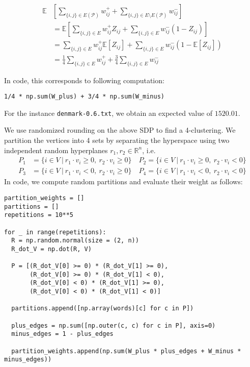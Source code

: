 \documentclass{article}
\begin{document}
\begin{align*}
    \mathbb{E}&\left[ \sum_{\{i,j\} \in E(\mathcal{P})} w_{ij}^+ + \sum_{\{i,j\} \in E \setminus E(\mathcal{P})} w_{ij}^-\right]\\
    &= \mathbb{E}\left[ \sum_{\{i,j\} \in E} w_{ij}^+ Z_{ij} + \sum_{\{i,j\} \in E} w_{ij}^- (1 - Z_{ij})\right]\\
    &= \sum_{\{i,j\} \in E} w_{ij}^+ \mathbb{E}[Z_{ij}] + \sum_{\{i,j\} \in E} w_{ij}^- (1 - \mathbb{E}[Z_{ij}])\\
    &= \frac{1}{4}\sum_{\{i,j\} \in E} w_{ij}^+ + \frac{3}{4}\sum_{\{i,j\} \in E} w_{ij}^-
\end{align*}

In code, this corresponds to following computation:
\begin{lstlisting}
1/4 * np.sum(W_plus) + 3/4 * np.sum(W_minus)
\end{lstlisting}
For the instance \texttt{denmark-0.6.txt}, we obtain an expected value of $1520.01$.\vspace{1em}

We use randomized rounding on the above SDP to find a 4-clustering. We partition the vertices into 4 sets by separating the hyperspace using two independent random hyperplanes $r_1, r_2 \in \mathbb{R}^n$, i.e.
\begin{align*}
    P_1 &= \{i \in V\ |\ r_1 \cdot v_i \ge 0,\ r_2 \cdot v_i \ge 0 \}\quad P_2 = \{i \in V\ |\ r_1 \cdot v_i \ge 0,\ r_2 \cdot v_i < 0 \}\\
    P_3 &= \{i \in V\ |\ r_1 \cdot v_i < 0,\ r_2 \cdot v_i \ge 0 \}\quad P_4 = \{i \in V\ |\ r_1 \cdot v_i < 0,\ r_2 \cdot v_i < 0 \}
\end{align*}
In code, we compute random partitions and evaluate their weight as follows:

\begin{lstlisting}
partition_weights = []
partitions = []
repetitions = 10**5

for _ in range(repetitions):
  R = np.random.normal(size = (2, n))
  R_dot_V = np.dot(R, V)
  
  P = [(R_dot_V[0] >= 0) * (R_dot_V[1] >= 0), 
       (R_dot_V[0] >= 0) * (R_dot_V[1] < 0), 
       (R_dot_V[0] < 0) * (R_dot_V[1] >= 0),
       (R_dot_V[0] < 0) * (R_dot_V[1] < 0)]
  
  partitions.append([np.array(words)[c] for c in P])
  
  plus_edges = np.sum([np.outer(c, c) for c in P], axis=0)
  minus_edges = 1 - plus_edges  
  
  partition_weights.append(np.sum(W_plus * plus_edges + W_minus * minus_edges))
\end{lstlisting}
\end{document}
